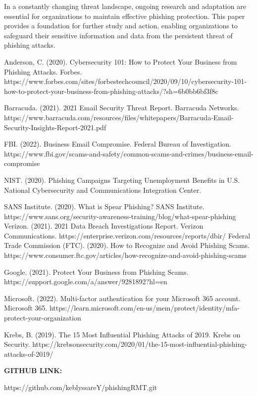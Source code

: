 \documentclass[conference]{IEEEtran}
\begin{document}
In a constantly changing threat landscape, ongoing research and adaptation are essential for organizations to maintain effective phishing protection. This paper provides a foundation for further study and action, enabling organizations to safeguard their sensitive information and data from the persistent threat of phishing attacks.






\begin{thebibliography}{00}
 Anderson, C. (2020). Cybersecurity 101: How to Protect Your Business from Phishing Attacks. Forbes. https://www.forbes.com/sites/forbestechcouncil/2020/09/10/cybersecurity-101-how-to-protect-your-business-from-phishing-attacks/?sh=6b0bb6bf3f8c

 Barracuda. (2021). 2021 Email Security Threat Report. Barracuda Networks. https://www.barracuda.com/resources/files/whitepapers/Barracuda-Email-Security-Insights-Report-2021.pdf

 FBI. (2022). Business Email Compromise. Federal Bureau of Investigation. https://www.fbi.gov/scams-and-safety/common-scams-and-crimes/business-email-compromise

 NIST. (2020). Phishing Campaigns Targeting Unemployment Benefits in U.S. National Cybersecurity and Communications Integration Center. 

 SANS Institute. (2020). What is Spear Phishing? SANS Institute. https://www.sans.org/security-awareness-training/blog/what-spear-phishing
 Verizon. (2021). 2021 Data Breach Investigations Report. Verizon Communications. https://enterprise.verizon.com/resources/reports/dbir/
 Federal Trade Commission (FTC). (2020). How to Recognize and Avoid Phishing Scams. https://www.consumer.ftc.gov/articles/how-recognize-and-avoid-phishing-scams

 Google. (2021). Protect Your Business from Phishing Scams. https://support.google.com/a/answer/9281892?hl=en

 Microsoft. (2022). Multi-factor authentication for your Microsoft 365 account. Microsoft 365. https://learn.microsoft.com/en-us/mem/protect/identity/mfa-protect-your-organization

 Krebs, B. (2019). The 15 Most Influential Phishing Attacks of 2019. Krebs on Security. https://krebsonsecurity.com/2020/01/the-15-most-influential-phishing-attacks-of-2019/

\end{thebibliography}

\textbf{GITHUB LINK:} 

https://github.com/keblyssareY/phishingRMT.git
\end{document}
